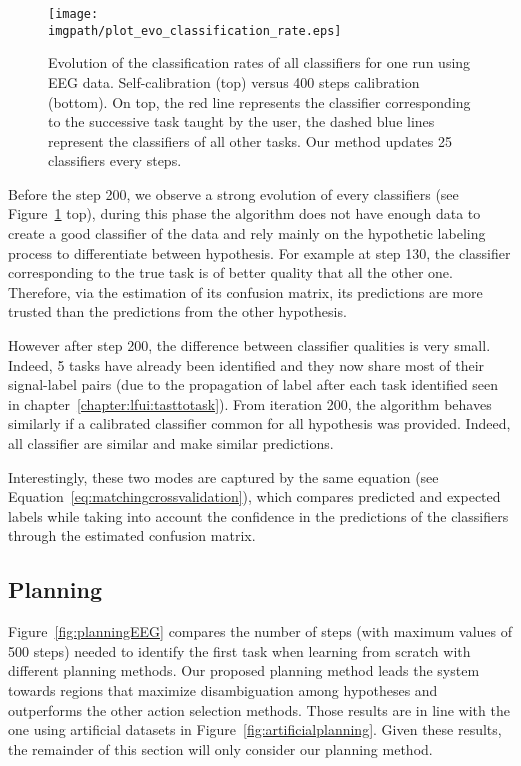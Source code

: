 \begin{figure}[!htbp]
\centering
\texttt{[image: \\imgpath/plot\_evo\_classification\_rate.eps]}
\caption{Evolution of the classification rates of all classifiers for one run using EEG data. Self-calibration (top) versus 400 steps calibration (bottom). On top, the red line represents the classifier corresponding to the successive task taught by the user, the dashed blue lines represent the classifiers of all other tasks. Our method updates 25 classifiers every steps.}
\label{fig:sequence_evolution}
\end{figure}

Before the step 200, we observe a strong evolution of every classifiers (see Figure~\ref{fig:sequence_evolution} top), during this phase the algorithm does not have enough data to create a good classifier of the data and rely mainly on the hypothetic labeling process to differentiate between hypothesis. For example at step 130, the classifier corresponding to the true task is of better quality that all the other one. Therefore, via the estimation of its confusion matrix, its predictions are more trusted than the predictions from the other hypothesis.

However after step 200, the difference between classifier qualities is very small. Indeed, 5 tasks have already been identified and they now share most of their signal-label pairs (due to the propagation of label after each task identified seen in chapter~\ref{chapter:lfui:tasttotask}). From iteration 200, the algorithm behaves similarly if a calibrated classifier common for all hypothesis was provided. Indeed,  all classifier are similar and make similar predictions. 

Interestingly, these two modes are captured by the same equation (see Equation~\ref{eq:matchingcrossvalidation}), which compares predicted and expected labels while taking into account the confidence in the predictions of the classifiers through the estimated confusion matrix.

\subsection{Planning}

Figure~\ref{fig:planningEEG} compares the number of steps (with maximum values of 500 steps) needed to identify the first task when learning from scratch with different planning methods. Our proposed planning method leads the system towards regions that maximize disambiguation among hypotheses and outperforms the other action selection methods. Those results are in line with the one using artificial datasets in Figure~\ref{fig:artificialplanning}. Given these results, the remainder of this section will only consider our planning method.


